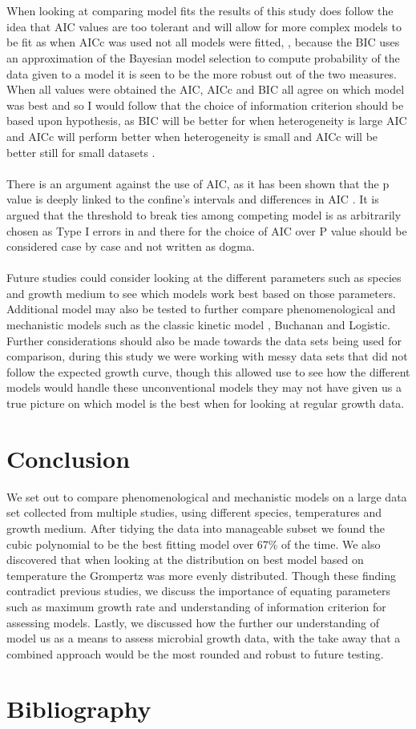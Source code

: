 \documentclass{article}
\begin{document}
	\\
	\\
	When looking at comparing model fits the results of this study does follow the idea that AIC values are too tolerant and will allow for more complex models to be fit as when AICc was used not all models were fitted, \autocite{Westerhoff1983ThermodynamicWastage}, because the BIC uses an approximation of the Bayesian model selection to compute probability of the data given to a model it is seen to be the more robust out of the two measures. When all values were obtained the AIC, AICc and BIC all agree on which model was best and so I would follow that the choice of information criterion should be based upon hypothesis, as BIC will be better for when heterogeneity is large AIC and AICc will perform better when heterogeneity is small and AICc will be better still for small datasets \autocite{MarkJ.Brewer2016TheHeterogeneity}. 
	\\
	\\
	There is an argument against the use of AIC, as it has been shown that the p value is deeply linked to the confine’s intervals and differences in AIC \autocite{Murtaugh2014InValues}. It is argued that the threshold to break ties among competing model is as arbitrarily chosen as Type I errors in and there for the choice of AIC over P value should be considered case by case and not written as dogma.
	\\
	\\
	Future studies could consider looking at the different parameters such as species and growth medium to see which models work best based on those parameters. Additional model may also be tested to further compare phenomenological and mechanistic models such as the classic kinetic model \autocite{Fessas2017IsothermalModeling}, Buchanan and Logistic. Further considerations should also be made towards the data sets being used for comparison, during this study we were working with messy data sets that did not follow the expected growth curve, though this allowed use to see how the different models would handle these unconventional models they may not have given us a true picture on which model is the best when for looking at regular growth data.
	
	\section{Conclusion}
	We set out to compare phenomenological and mechanistic models on a large data set collected from multiple studies, using different species, temperatures and growth medium. After tidying the data into manageable subset we found the cubic polynomial to be the best fitting model over 67\% of the time. We also discovered that when looking at the distribution on best model based on temperature the Grompertz was more evenly distributed. Though these finding contradict previous studies, we discuss the importance of equating parameters such as maximum growth rate and understanding of information criterion for assessing models. Lastly, we discussed how the further our understanding of model us as a means to assess microbial growth data, with the take away that a combined approach would be the most rounded and robust to future testing.
	\section{Bibliography}
	
	
	
	\printbibliography
\end{document}
